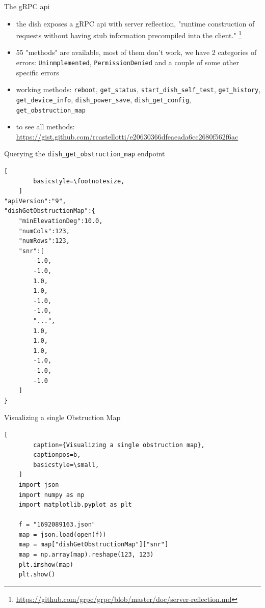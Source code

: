 \documentclass[NET,english,beameralt]{tumbeamer}
\begin{document}
\begin{frame}{The gRPC api}
    \begin{itemize}
        \item the dish exposes a gRPC api with server reflection, "runtime construction of requests without having stub
        information precompiled into the client."
        \footnote{\href{https://github.com/grpc/grpc/blob/master/doc/server-reflection.md}{https://github.com/grpc/grpc/blob/master/doc/server-reflection.md}}
        \item 55 "methods" are available, most of them don't work, we have 2 categories of errors: \texttt{Uninmplemented},
        \texttt{PermissionDenied} and a couple of some other specific errors 
        \item working methods: \texttt{reboot}, \texttt{get\_status}, \texttt{start\_dish\_self\_test}, \texttt{get\_history}, \texttt{get\_device\_info}, \texttt{dish\_power\_save}, \texttt{dish\_get\_config}, \texttt{get\_obstruction\_map}
        \item to see all methods:
        \href{https://gist.github.com/rcastellotti/e20630366dfeaeada6cc2680f562f6ac}{https://gist.github.com/rcastellotti/e20630366dfeaeada6cc2680f562f6ac}
    \end{itemize}
\end{frame}

\begin{frame}[fragile]{Querying the  \texttt{dish\_get\_obstruction\_map} endpoint }
    \begin{lstlisting}[
        basicstyle=\footnotesize,
    ]
"apiVersion":"9",
"dishGetObstructionMap":{
    "minElevationDeg":10.0,
    "numCols":123,
    "numRows":123,
    "snr":[
        -1.0,
        -1.0,
        1.0,
        1.0,
        -1.0,
        -1.0,
        "...",
        1.0,
        1.0,
        1.0,
        -1.0,
        -1.0,
        -1.0
    ]
}
    \end{lstlisting}
\end{frame}

\begin{frame}[fragile]{Visualizing a single Obstruction Map}
    \begin{lstlisting}[
        caption={Visualizing a single obstruction map},
        captionpos=b,
        basicstyle=\small,
    ]
    import json
    import numpy as np
    import matplotlib.pyplot as plt

    f = "1692089163.json"
    map = json.load(open(f))
    map = map["dishGetObstructionMap"]["snr"]
    map = np.array(map).reshape(123, 123)
    plt.imshow(map)
    plt.show()
    \end{lstlisting}
\end{frame}
\end{document}
